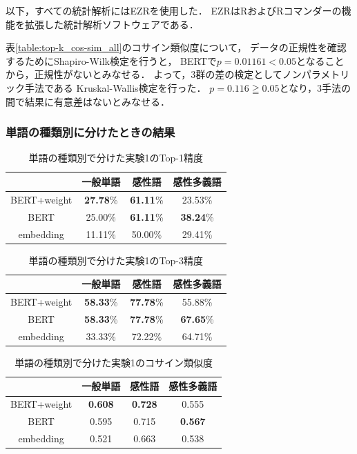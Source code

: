 			以下，すべての統計解析にはEZR\cite{EZR}を使用した．
			EZRはRおよびRコマンダーの機能を拡張した統計解析ソフトウェアである．
			
			表\ref{table:top-k_cos-sim_all}のコサイン類似度について，
			データの正規性を確認するためにShapiro-Wilk検定\cite{shapiro_wilk_test}を行うと，
			BERTで$p=0.01161<0.05$となることから，正規性がないとみなせる．
			よって，3群の差の検定としてノンパラメトリック手法である
			Kruskal-Wallis検定\cite{kruskal_wallis_test}を行った．
			$p=0.116\geqq0.05$となり，3手法の間で結果に有意差はないとみなせる．
			
		\subsubsection{単語の種類別に分けたときの結果}
			\begin{table}[H]
				\centering
				\caption{単語の種類別で分けた実験1のTop-1精度}
				\label{table:top-1_hinshi}
					\begin{tabular}{cccc}
						\hline
						& 一般単語 & 感性語 & 感性多義語 \\
						\hline \hline
						BERT+weight & \textbf{27.78}\% & \textbf{61.11}\% & 23.53\% \\
						BERT & 25.00\% & \textbf{61.11}\% & \textbf{38.24}\% \\
						embedding & 11.11\% & 50.00\% & 29.41\% \\
						\hline
					\end{tabular}
			\end{table}

			\begin{table}[H]
				\centering
				\caption{単語の種類別で分けた実験1のTop-3精度}
				\label{table:top-3_hinshi}
					\begin{tabular}{cccc}
						\hline
						& 一般単語 & 感性語 & 感性多義語 \\
						\hline \hline
						BERT+weight & \textbf{58.33}\% & \textbf{77.78}\% & 55.88\% \\
						BERT & \textbf{58.33}\% & \textbf{77.78}\% & \textbf{67.65}\% \\
						embedding & 33.33\% & 72.22\% & 64.71\% \\
						\hline
					\end{tabular}
			\end{table}

			\begin{table}[H]
				\centering
				\caption{単語の種類別で分けた実験1のコサイン類似度}
				\label{table:cos_sim_hinshi}
					\begin{tabular}{cccc}
						\hline
						& 一般単語 & 感性語 & 感性多義語 \\
						\hline \hline
						BERT+weight & \textbf{0.608} & \textbf{0.728} & 0.555 \\
						BERT & 0.595 & 0.715 & \textbf{0.567} \\
						embedding & 0.521 & 0.663 & 0.538 \\
						\hline
					\end{tabular}
			\end{table}

